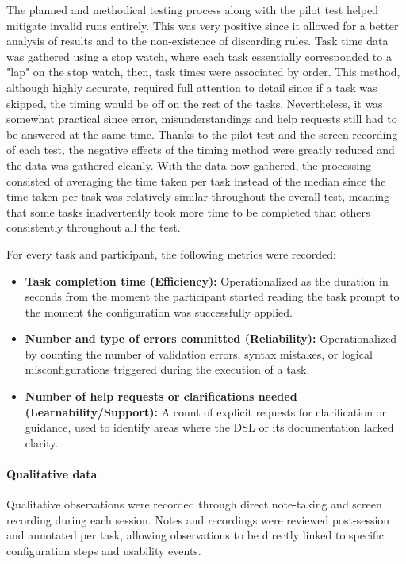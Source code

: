 The planned and methodical testing process along with the pilot test helped mitigate invalid runs entirely. This was very positive since it allowed for a better analysis of results and to the non-existence of discarding rules.
Task time data was gathered using a stop watch, where each task essentially corresponded to a "lap" on the stop watch, then, task times were associated by order. This method, although highly accurate, required full attention to detail since if a task was skipped, the timing would be off on the rest of the tasks. Nevertheless, it was somewhat practical since error, misunderstandings and help requests still had to be answered at the same time. Thanks to the pilot test and the screen recording of each test, the negative effects of the timing method were greatly reduced and the data was gathered cleanly.
With the data now gathered, the processing consisted of averaging the time taken per task instead of the median since the time taken per task was relatively similar throughout the overall test, meaning that some tasks inadvertently took more time to be completed than others consistently throughout all the test.

For every task and participant, the following metrics were recorded:

\begin{itemize}
	\item \textbf{Task completion time (Efficiency):} Operationalized as the duration in seconds from the moment the participant started reading the task prompt to the moment the configuration was successfully applied.
	\item \textbf{Number and type of errors committed (Reliability):} Operationalized by counting the number of validation errors, syntax mistakes, or logical misconfigurations triggered during the execution of a task.
	\item \textbf{Number of help requests or clarifications needed (Learnability/Support):} A count of explicit requests for clarification or guidance, used to identify areas where the \gls{DSL} or its documentation lacked clarity.
\end{itemize}


\paragraph{Qualitative data}
\label{sec:test_usabl_qual}

Qualitative observations were recorded through direct note-taking and screen recording during each session. Notes and recordings were reviewed post-session and annotated per task, allowing observations to be directly linked to specific configuration steps and usability events.

